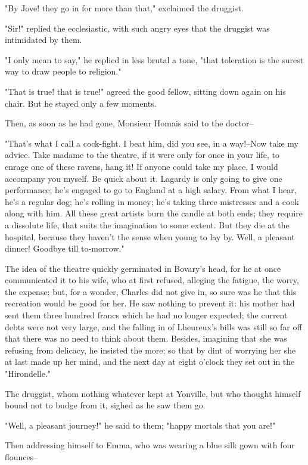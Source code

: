 \documentclass{tufte-book}
\begin{document}
"By Jove! they go in for more than that," exclaimed the druggist.

"Sir!" replied the ecclesiastic, with such angry eyes that the druggist
was intimidated by them.

"I only mean to say," he replied in less brutal a tone, "that toleration
is the surest way to draw people to religion."

"That is true! that is true!" agreed the good fellow, sitting down again
on his chair. But he stayed only a few moments.

Then, as soon as he had gone, Monsieur Homais said to the doctor--

"That's what I call a cock-fight. I beat him, did you see, in a
way!--Now take my advice. Take madame to the theatre, if it were only
for once in your life, to enrage one of these ravens, hang it! If anyone
could take my place, I would accompany you myself. Be quick about it.
Lagardy is only going to give one performance; he's engaged to go to
England at a high salary. From what I hear, he's a regular dog; he's
rolling in money; he's taking three mistresses and a cook along with
him. All these great artists burn the candle at both ends; they require
a dissolute life, that suits the imagination to some extent. But they
die at the hospital, because they haven't the sense when young to lay
by. Well, a pleasant dinner! Goodbye till to-morrow."

The idea of the theatre quickly germinated in Bovary's head, for he at
once communicated it to his wife, who at first refused, alleging the
fatigue, the worry, the expense; but, for a wonder, Charles did not give
in, so sure was he that this recreation would be good for her. He saw
nothing to prevent it: his mother had sent them three hundred francs
which he had no longer expected; the current debts were not very large,
and the falling in of Lheureux's bills was still so far off that
there was no need to think about them. Besides, imagining that she
was refusing from delicacy, he insisted the more; so that by dint of
worrying her she at last made up her mind, and the next day at eight
o'clock they set out in the "Hirondelle."

The druggist, whom nothing whatever kept at Yonville, but who thought
himself bound not to budge from it, sighed as he saw them go.

"Well, a pleasant journey!" he said to them; "happy mortals that you
are!"

Then addressing himself to Emma, who was wearing a blue silk gown with
four flounces--
\end{document}
